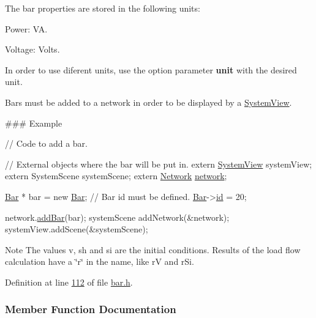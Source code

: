 The bar properties are stored in the following units\+:
\begin{DoxyItemize}
\item Power\+: V\+A.
\item Voltage\+: Volts.
\end{DoxyItemize}

In order to use diferent units, use the option parameter {\bfseries unit} with the desired unit.

Bars must be added to a network in order to be displayed by a \hyperlink{class_system_view}{System\+View}.

\#\#\# Example 
\begin{DoxyCode}
\textcolor{comment}{// Code to add a bar.}

\textcolor{comment}{// External objects where the bar will be put in.}
\textcolor{keyword}{extern} \hyperlink{class_system_view}{SystemView} systemView;
\textcolor{keyword}{extern} SystemScene systemScene;
\textcolor{keyword}{extern} \hyperlink{class_network}{Network} \hyperlink{class_bar_a80025f13884750add58cc61b318357ff}{network};

\hyperlink{class_bar}{Bar} * bar = \textcolor{keyword}{new} \hyperlink{group___models_ga9cae2188fcc6cce41caa7898c64548d1}{Bar};
\textcolor{comment}{// Bar id must be defined.}
\hyperlink{class_bar}{Bar}->\hyperlink{class_bar_a9dc5c6a6d44fe412ae34ef8a881b8dce}{id} = 20;

network.\hyperlink{group___graphics_ga8c5dfef0216731246f7411e1a5fbee01}{addBar}(bar);
systemScene addNetwork(&network);
systemView.addScene(&systemScene);
\end{DoxyCode}


\begin{DoxyNote}{Note}
The values v, sh and si are the initial conditions. Results of the load flow calculation have a \char`\"{}r\char`\"{} in the name, like r\+V and r\+Si. 
\end{DoxyNote}


Definition at line \hyperlink{bar_8h_source_l00112}{112} of file \hyperlink{bar_8h_source}{bar.\+h}.



\subsubsection{Member Function Documentation}
\hypertarget{class_bar_a66bcbd19582dddee7e171ae5a4475f4b}{}
